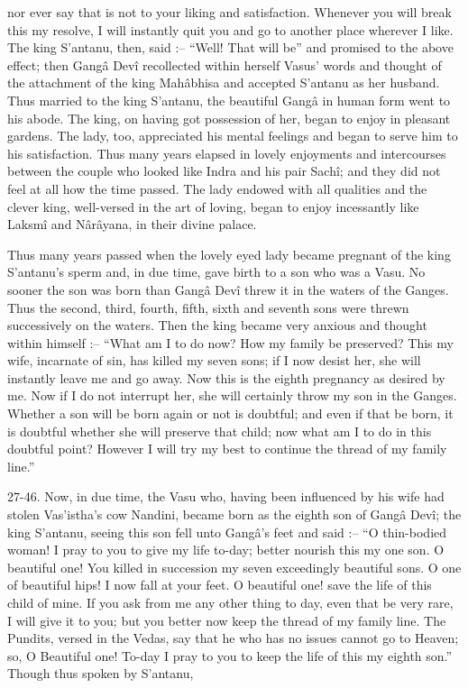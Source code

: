 nor ever say that is not to your liking and satisfaction. Whenever you will break this my resolve, I will instantly quit you and go to another place wherever I like. The king S’antanu, then, said :-- “Well! That will be” and promised to the above effect; then Gangâ Devî recollected within herself Vasus' words and thought of the attachment of the king Mahâbhisa and accepted S’antanu as her husband. Thus married to the king S’antanu, the beautiful Gangâ in human form went to his abode. The king, on having got possession of her, began to enjoy in pleasant gardens. The lady, too, appreciated his mental feelings and began to serve him to his satisfaction. Thus many years elapsed in lovely enjoyments and intercourses between the couple who looked like Indra and his pair Sachî; and they did not feel at all how the time passed. The lady endowed with all qualities and the clever king, well-versed in the art of loving, began to enjoy incessantly like Laksmî and Nârâyana, in their divine palace.

 

Thus many years passed when the lovely eyed lady became pregnant of the king S’antanu's sperm and, in due time, gave birth to a son who was a Vasu. No sooner the son was born than Gangâ Devî threw it in the waters of the Ganges. Thus the second, third, fourth, fifth, sixth and seventh sons were threwn successively on the waters. Then the king became very anxious and thought within himself :-- “What am I to do now? How my family be preserved? This my wife, incarnate of sin, has killed my seven sons; if I now desist her, she will instantly leave me and go away. Now this is the eighth pregnancy as desired by me. Now if I do not interrupt her, she will certainly throw my son in the Ganges. Whether a son will be born again or not is doubtful; and even if that be born, it is doubtful whether she will preserve that child; now what am I to do in this doubtful point? However I will try my best to continue the thread of my family line.”

 

27-46. Now, in due time, the Vasu who, having been influenced by his wife had stolen Vas’istha's cow Nandini, became born as the eighth son of Gangâ Devî; the king S’antanu, seeing this son fell unto Gangâ's feet and said :-- “O thin-bodied woman! I pray to you to give my life to-day; better nourish this my one son. O beautiful one! You killed in succession my seven exceedingly beautiful sons. O one of beautiful hips! I now fall at your feet. O beautiful one! save the life of this child of mine. If you ask from me any other thing to day, even that be very rare, I will give it to you; but you better now keep the thread of my family line. The Pundits, versed in the Vedas, say that he who has no issues cannot go to Heaven; so, O Beautiful one! To-day I pray to you to keep the life of this my eighth son.” Though thus spoken by S’antanu,

